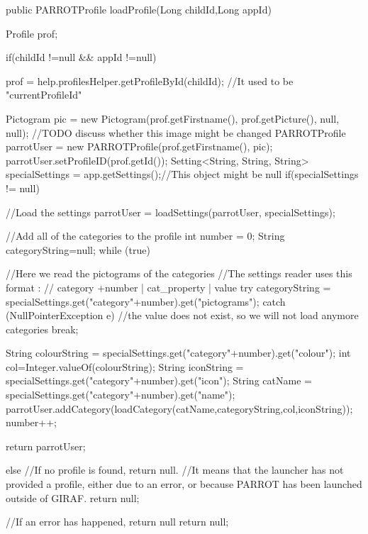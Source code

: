 \begin{source}{}
public PARROTProfile loadProfile(Long childId,Long appId)	
	{
		Profile prof;

		if(childId !=null && appId !=null)
		{
			prof = help.profilesHelper.getProfileById(childId);	//It used to be "currentProfileId"

			Pictogram pic = new Pictogram(prof.getFirstname(), prof.getPicture(), null, null);	//TODO discuss whether this image might be changed
			PARROTProfile parrotUser = new PARROTProfile(prof.getFirstname(), pic);
			parrotUser.setProfileID(prof.getId());
			Setting<String, String, String> specialSettings = app.getSettings();//This object might be null
			if(specialSettings != null)
			{
				//Load the settings
				parrotUser = loadSettings(parrotUser, specialSettings);

				//Add all of the categories to the profile
				int number = 0;
				String categoryString=null;
				while (true)
				{
					//Here we read the pictograms of the categories
					//The settings reader uses this format :
					// category +number | cat_property | value
					try
					{
						categoryString = specialSettings.get("category"+number).get("pictograms");
					}
					catch (NullPointerException e)
					{
						//the value does not exist, so we will not load anymore categories
						break;
					}

					String colourString = specialSettings.get("category"+number).get("colour");
					int col=Integer.valueOf(colourString);
					String iconString = specialSettings.get("category"+number).get("icon");
					String catName = specialSettings.get("category"+number).get("name");
					parrotUser.addCategory(loadCategory(catName,categoryString,col,iconString));
					number++;
				}

				return parrotUser;
			}
			else
			{
				//If no profile is found, return null.
				//It means that the launcher has not provided a profile, either due to an error, or because PARROT has been launched outside of GIRAF.
				return null;
			}
		}
		//If an error has happened, return null
		return null;


	}
\end{source}

